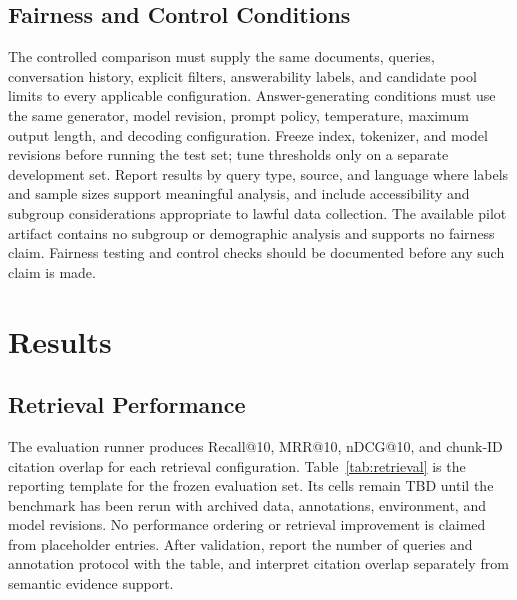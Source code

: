 \documentclass[conference]{IEEEtran}
\begin{document}
\subsection{Fairness and Control Conditions}
The controlled comparison must supply the same documents, queries,
conversation history, explicit filters, answerability labels, and candidate
pool limits to every applicable configuration. Answer-generating conditions
must use the same generator, model revision, prompt policy, temperature,
maximum output length, and decoding configuration. Freeze index, tokenizer,
and model revisions before running the test set; tune thresholds only on a
separate development set. Report results by query type, source, and language
where labels and sample sizes support meaningful analysis, and include
accessibility and subgroup considerations appropriate to lawful data
collection. The available pilot artifact contains no subgroup or demographic analysis
and supports no fairness claim. Fairness testing and
control checks should be documented before any such claim is made.

\section{Results}

\subsection{Retrieval Performance}
The evaluation runner produces Recall@10, MRR@10, nDCG@10, and chunk-ID
citation overlap for each retrieval configuration. Table~\ref{tab:retrieval}
is the reporting template for the frozen evaluation set. Its cells remain
TBD until the benchmark has been rerun with archived data, annotations,
environment, and model revisions. No performance ordering or retrieval
improvement is claimed from placeholder entries. After validation, report
the number of queries and annotation protocol with the table, and interpret
citation overlap separately from semantic evidence support.
\end{document}
